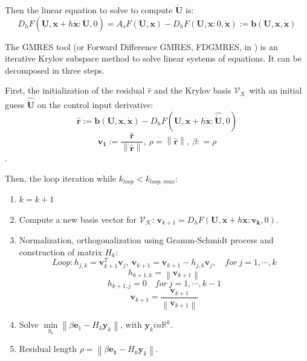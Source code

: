 \documentclass[a4paper, 12pt]{report}
\newcommand\norm[1]{\left\lVert#1\right\rVert}
\begin{document}
Then the linear equation to solve to compute $\boldsymbol{\dot U}$ is:
\[ D_h F(\boldsymbol{U}, \boldsymbol{x}+ h\boldsymbol{\dot x} : \boldsymbol{\dot U}, 0) = A_s F(\boldsymbol{U}, \boldsymbol{x}) - D_h F(\boldsymbol{U}, \boldsymbol{x} : 0, \boldsymbol{\dot x}) := \boldsymbol{b}(\boldsymbol{U}, \boldsymbol{x}, \boldsymbol{\dot x}) \]

The GMRES tool (or Forward Difference GMRES, FDGMRES, in \cite{Kelley1995}) is an iterative Krylov subspace method to solve linear systems of equations. It can be decomposed in three steps.

First, the initialization of the residual $\hat r$ and the Krylov basis $\mathcal{V}_\mathcal{K}$ with an initial guess $\boldsymbol{\hat{ \dot U}}$ on the control input derivative:
\[ \boldsymbol{\hat r} := \boldsymbol{b}(\boldsymbol{U}, \boldsymbol{x}, \boldsymbol{\dot x}) - D_h F(\boldsymbol{U}, \boldsymbol{x}+ h\boldsymbol{\dot x} : \boldsymbol{\hat{\dot U}}, 0) \]
\[\boldsymbol{v_1} := \frac{\boldsymbol{\hat r}}{\norm{\boldsymbol{\hat r}}},\ \rho = \norm{\boldsymbol{\hat r}},\ \beta: = \rho \].

Then, the loop iteration while $k_{loop} < k_{loop,max}$:
\begin{enumerate}
\item $k = k+1$
\item Compute a new basis vector for $\mathcal{V}_\mathcal{K}$: $\boldsymbol{v}_{k+1} =  D_h F(\boldsymbol{U}, \boldsymbol{x}+ h\boldsymbol{\dot x} : \boldsymbol{v_k}, 0)$.
\item Normalization, orthogonalization using Gramm-Schmidt process and construction of matrix $H_k$:
\[ Loop: h_{j,k} = \boldsymbol{v}_{k+1}^T \boldsymbol{v}_j,\ \boldsymbol{v}_{k+1} = \boldsymbol{v}_{k+1} - h_{j,k}\boldsymbol{v}_j, \quad for\ j = 1, \cdots, k \]
\[ h_{k+1,k} = \norm{\boldsymbol{v}_{k+1}} \]
\[ h_{k+1, j} =  0\quad for\ j = 1, \cdots, k-1 \]
\[ \boldsymbol{v}_{k+1} = \frac{\boldsymbol{v}_{k+1}}{\norm{\boldsymbol{v}_{k+1}}} \]
\item Solve $\min\limits_{y_k}\norm{\beta \boldsymbol{e}_1 - H_k\boldsymbol{y}_k}$, with $\boldsymbol{y}_k in \mathbb{R}^k$.
\item Residual length $\rho = \norm{\beta \boldsymbol{e_1} - H_k\boldsymbol{y}_k}$.
\end{enumerate}
\end{document}
